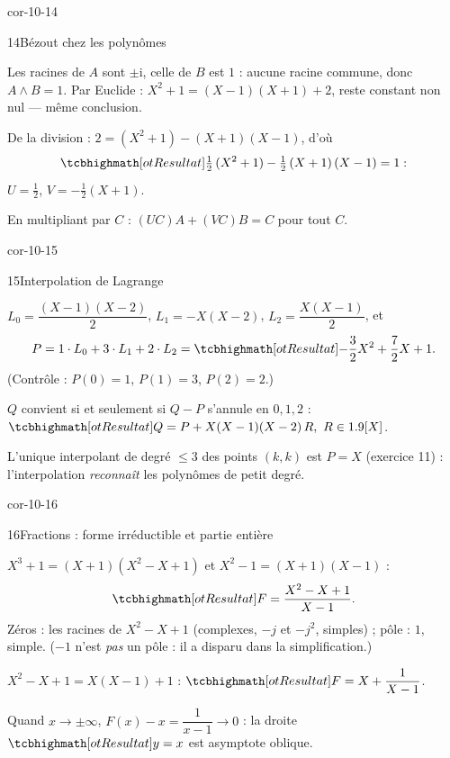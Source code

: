 \begin{blocLivre}{cor-10-14}
\begin{corrige}{14}{Bézout chez les polynômes}
\begin{questions}
  \item Les racines de $A$ sont $\pm\mathrm{i}$, celle de $B$ est $1$ :
    aucune racine commune, donc $A\wedge B=1$. Par Euclide :
    $X^{2}+1=(X-1)(X+1)+2$, reste constant non nul — même conclusion.
  \item De la division : $2=(X^{2}+1)-(X+1)(X-1)$, d'où
    \[
      \res{\tfrac12\,(X^{2}+1)-\tfrac12\,(X+1)\,(X-1)=1} :
    \]
    $U=\tfrac12$, $V=-\tfrac12(X+1)$.
  \item En multipliant par $C$ : $(UC)A+(VC)B=C$ pour tout $C$.
\end{questions}
\end{corrige}
\end{blocLivre}

\begin{blocLivre}{cor-10-15}
\begin{corrige}{15}{Interpolation de Lagrange}
\begin{questions}
  \item $L_0=\dfrac{(X-1)(X-2)}{2}$, $L_1=-X(X-2)$,
    $L_2=\dfrac{X(X-1)}{2}$, et
    \[
      P=1\cdot L_0+3\cdot L_1+2\cdot L_2
      =\res{-\frac32X^{2}+\frac72X+1}.
    \]
    (Contrôle : $P(0)=1$, $P(1)=3$, $P(2)=2$.)
  \item $Q$ convient si et seulement si $Q-P$ s'annule en $0,1,2$ :
    $\res{Q=P+X(X-1)(X-2)\,R},\ R\in\R[X]$.
  \item L'unique interpolant de degré $\leq3$ des points $(k,k)$ est
    $P=X$ (exercice 11) : l'interpolation \emph{reconnaît} les polynômes
    de petit degré.
\end{questions}
\end{corrige}
\end{blocLivre}

\begin{blocLivre}{cor-10-16}
\begin{corrige}{16}{Fractions : forme irréductible et partie entière}
\begin{questions}
  \item $X^{3}+1=(X+1)(X^{2}-X+1)$ et $X^{2}-1=(X+1)(X-1)$ :
    \[
      \res{F=\frac{X^{2}-X+1}{X-1}}.
    \]
    Zéros : les racines de $X^{2}-X+1$ (complexes, $-j$ et $-j^{2}$,
    simples) ; pôle : $1$, simple. ($-1$ n'est \emph{pas} un pôle : il a
    disparu dans la simplification.)
  \item $X^{2}-X+1=X(X-1)+1$ :
    $\res{F=X+\dfrac{1}{X-1}}$.
  \item Quand $x\to\pm\infty$, $F(x)-x=\dfrac{1}{x-1}\to0$ : la droite
    $\res{y=x}$ est asymptote oblique.
\end{questions}
\end{corrige}
\end{blocLivre}


